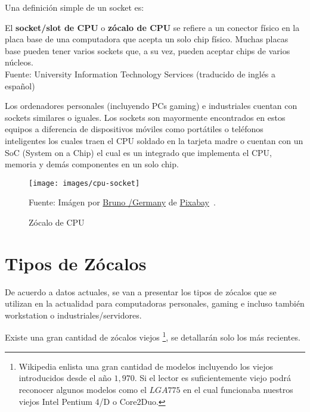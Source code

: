 \documentclass[conference]{IEEEtran}
\begin{document}
    Una definición simple de un socket es:

    \begin{displayquote}
        El \textbf{socket/slot de CPU} o \textbf{zócalo de CPU} se refiere a
        un conector físico en la placa base de una computadora que acepta un
        solo chip físico. Muchas placas base pueden tener varios sockets que,
        a su vez, pueden aceptar chips de varios núcleos.\\
        \small Fuente: University Information Technology Services (traducido
        de inglés a español)~\cite{university-information-technology-services-2019}
    \end{displayquote}

    Los ordenadores personales (incluyendo PCs gaming) e industriales cuentan
    con sockets similares o iguales. Los sockets son mayormente encontrados
    en estos equipos a diferencia de dispositivos móviles como portátiles o
    teléfonos inteligentes los cuales traen el CPU soldado en la tarjeta
    madre o cuentan con un SoC (System on a Chip) el cual es un integrado que
    implementa el CPU, memoria y demás componentes en un solo chip.

    \begin{figure}[H]
        \centering
        \texttt{[image: images/cpu-socket]}
        \caption{Zócalo de CPU} \footnotesize
        Fuente: Imágen por \href{https://pixabay.com/users/bru-no-1161770}{Bruno /Germany} de \href{https://pixabay.com}{Pixabay}~\cite{pixabay-cpu-socket-2019}.\label{fig:figure}
    \end{figure}

    \section{Tipos de Zócalos}\label{sec:tipos-de-zócalos}

    De acuerdo a datos actuales, se van a presentar los tipos de zócalos que
    se utilizan en la actualidad para computadoras personales, gaming e
    incluso también workstation o industriales/servidores.

    \bigbreak

    Existe una gran cantidad de zócalos viejos \footnote{Wikipedia
    \cite{wikipedia-contributors-2022} enlista una gran cantidad de modelos
    incluyendo los viejos introducidos desde el año $1,970$. Si el lector es
    suficientemente viejo podrá reconocer algunos modelos como el $LGA 775$
        en el cual funcionaba nuestros viejos Intel Pentium 4/D o Core2Duo.},
    se detallarán solo los más recientes.
\end{document}
